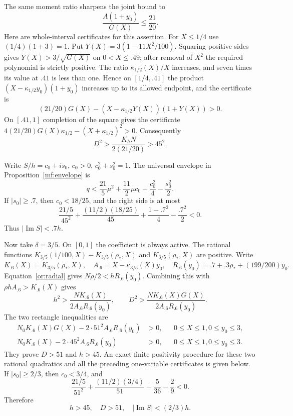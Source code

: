 \documentclass[11pt,reqno]{amsart}
\numberwithin{equation}{section}
\theoremstyle{definition}
\theoremstyle{remark}
\renewcommand{\Im}{\operatorname{Im}}
\begin{document}
The same moment ratio sharpens the joint bound to
\begin{equation}\label{or:T-joint-gap}
                  \frac{A(1+y_0)}{G(X)}\le\frac{21}{20}.
\end{equation}
Here are whole-interval certificates for this assertion.  For
$X\le1/4$ use $(1/4)(1+3)=1$.  Put
$Y(X)=3(1-11X^2/100)$.  Squaring positive sides gives
$Y(X)>3/\sqrt{G(X)}$ on $0<X\le.49$; after removal of $X^2$ the
required polynomial is strictly positive.  The ratio
$\kappa_{1/2}(X)/X$ increases, and seven times its value at $.41$
is less than one.  Hence on $[1/4,.41]$ the product
$(X-\kappa_{1/2}y_0)(1+y_0)$ increases up to its allowed endpoint,
and the certificate is
\[
 (21/20)G(X)-(X-\kappa_{1/2}Y(X))(1+Y(X))>0.
\]
On $[.41,1]$ completion of the square gives the certificate
$4(21/20)G(X)\kappa_{1/2}-(X+\kappa_{1/2})^2>0$.
Consequently
\begin{equation}\label{or:T-D45}
                 D^2>\frac{K_hN}{2(21/20)}>45^2.
\end{equation}

Write $S/h=c_0+is_0$, $c_0>0$, $c_0^2+s_0^2=1$.
The universal envelope in Proposition~\ref{mf:envelope} is
\begin{equation}\label{or:T-matrix}
 q<\frac{21}{5}\mu^2+\frac{11}{2}\mu c_0
                         +\frac{c_0^2}{4}-\frac{s_0^2}{2}.
\end{equation}
If $|s_0|\ge.7$, then $c_0<18/25$, and the right side is at most
\[
 \frac{21/5}{45^2}+\frac{(11/2)(18/25)}{45}
                       +\frac{1-.7^2}{4}-\frac{.7^2}{2}<0.
\]
Thus $|\Im S|<.7h$.

Now take $\delta=3/5$.  On $[0,1]$ the coefficient is always active.
The rational functions
$K_{3/5}(1/100,X)-K_{3/5}(\rho_*,X)$ and
$K_{3/5}(\rho_*,X)$ are positive.  Write
\[
 K_{.6}(X)=K_{3/5}(\rho_*,X),\quad
 A_{.6}=X-\kappa_{3/5}(X)y_0,\quad
 R_{.6}(y_0)=.7+.3\rho_*+(199/200)y_0.
\]
Equation~\eqref{or:radial} gives $N\rho/2<hR_{.6}(y_0)$.
Combining this with $\rho hA_{.6}>K_{.6}(X)$ gives
\[
 h^2>\frac{NK_{.6}(X)}{2A_{.6}R_{.6}(y_0)},\qquad
 D^2>\frac{NK_{.6}(X)G(X)}{2A_{.6}R_{.6}(y_0)}.
\]
The two rectangle inequalities are
\begin{align}
 N_0K_{.6}(X)G(X)-2\cdot51^2 A_{.6}R_{.6}(y_0)&>0,
       &&0\le X\le1, 0\le y_0\le3,\label{or:T-D51-poly}\\
 N_0K_{.6}(X)-2\cdot45^2 A_{.6}R_{.6}(y_0)&>0,
       &&0\le X\le1, 0\le y_0\le3.\label{or:T-h45-poly}
\end{align}
They prove $D>51$ and $h>45$.  An exact finite positivity procedure
for these two rational quadratics and all the preceding one-variable
certificates is given below.  If $|s_0|\ge2/3$, then $c_0<3/4$, and
\[
 \frac{21/5}{51^2}+\frac{(11/2)(3/4)}{51}
                                  +\frac5{36}-\frac29<0.
\]
Therefore
\begin{equation}\label{or:T-prephase}
                      h>45,\quad D>51,\quad |\Im S|<(2/3)h.
\end{equation}
\end{document}
